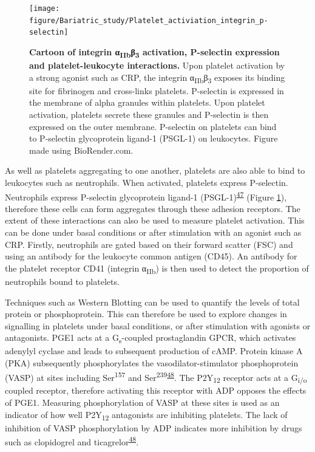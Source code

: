 \documentclass[11pt,twoside]{bristolthesis}
\begin{document}
\begin{figure}
\texttt{[image: figure/Bariatric\_study/Platelet\_activiation\_integrin\_p-selectin]} \caption[Cartoon of integrin α\textsubscript{IIb}β\textsubscript{3} activation, P-selectin expression and platelet-leukocyte interactions]{\textbf{Cartoon of integrin α\textsubscript{IIb}β\textsubscript{3} activation, P-selectin expression and platelet-leukocyte interactions.} Upon platelet activation by a strong agonist such as CRP, the integrin α\textsubscript{IIb}β\textsubscript{3} exposes its binding site for fibrinogen and cross-links platelets. P-selectin is expressed in the membrane of alpha granules within platelets. Upon platelet activation, platelets secrete these granules and P-selectin is then expressed on the outer membrane. P-selectin on platelets can bind to P-selectin glycoprotein ligand-1 (PSGL-1) on leukocytes. Figure made using BioRender.com.}\label{fig:platelet-activation-background}
\end{figure}
As well as platelets aggregating to one another, platelets are also able to bind to leukocytes such as neutrophils. When activated, platelets express P-selectin. Neutrophils express P-selectin glycoprotein ligand-1 (PSGL-1)\textsuperscript{\protect\hyperlink{ref-Zarbock2007}{47}} (Figure \ref{fig:platelet-activation-background}), therefore these cells can form aggregates through these adhesion receptors. The extent of these interactions can also be used to measure platelet activation. This can be done under basal conditions or after stimulation with an agonist such as CRP. Firstly, neutrophils are gated based on their forward scatter (FSC) and using an antibody for the leukocyte common antigen (CD45). An antibody for the platelet receptor CD41 (integrin α\textsubscript{IIb}) is then used to detect the proportion of neutrophils bound to platelets.

Techniques such as Western Blotting can be used to quantify the levels of total protein or phosphoprotein. This can therefore be used to explore changes in signalling in platelets under basal conditions, or after stimulation with agonists or antagonists. PGE1 acts at a G\textsubscript{s}-coupled prostaglandin GPCR, which activates adenylyl cyclase and leads to subsequent production of cAMP. Protein kinase A (PKA) subsequently phosphorylates the vasodilator-stimulator phosphoprotein (VASP) at sites including Ser\textsuperscript{157} and Ser\textsuperscript{239}\textsuperscript{\protect\hyperlink{ref-Hezard2005}{48}}. The P2Y\textsubscript{12} receptor acts at a G\textsubscript{i/o} coupled receptor, therefore activating this receptor with ADP opposes the effects of PGE1. Measuring phosphorylation of VASP at these sites is used as an indicator of how well P2Y\textsubscript{12} antagonists are inhibiting platelets. The lack of inhibition of VASP phosphorylation by ADP indicates more inhibition by drugs such as clopidogrel and ticagrelor\textsuperscript{\protect\hyperlink{ref-Hezard2005}{48}}.
\end{document}
